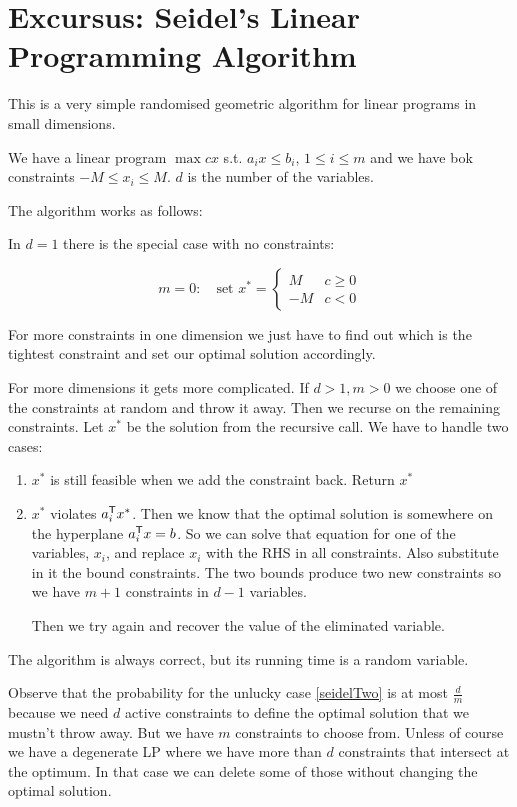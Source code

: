 \section{Excursus: Seidel's Linear Programming Algorithm}

This is a very simple randomised geometric algorithm for linear programs in small dimensions.

We have a linear program $\max cx$ s.t. $a_ix\leq b_i$, $1\leq i\leq m$ and we have bok constraints $-M\leq x_i \leq M$. $d$ is the number of the variables.

The algorithm works as follows:

In $d=1$ there is the special case with no constraints:

\[m=0: \quad \text{set } x^* = \begin{cases} M & c\geq 0\\ -M & c<0\end{cases}\]

For more constraints in one dimension we just have to find out which is the tightest constraint and set our optimal solution accordingly.

For more dimensions it gets more complicated. If $d>1, m>0$ we choose one of the constraints at random and throw it away. Then we recurse on the remaining constraints. Let $x^*$ be the solution from the recursive call. We have to handle two cases:

\begin{enumerate}
\item $x^*$ is still feasible when we add the constraint back. Return $x^*$
\item \label{seidelTwo} $x^*$ violates ${a}^\text{\upshape \sffamily T}_i x^*$. Then we know that the optimal solution is somewhere on the hyperplane ${a}^\text{\upshape \sffamily T}_i x = b$. So we can solve that equation for one of the variables, $x_i$, and replace $x_i$ with the RHS in all constraints. Also substitute in it the bound constraints. The two bounds produce two new constraints so we have $m+1$ constraints in $d-1$ variables.

Then we try again and recover the value of the eliminated variable.
\end{enumerate}

The algorithm is always correct, but its running time is a random variable.

Observe that the probability for the unlucky case \ref{seidelTwo} is at most $\frac dm$ because we need $d$ active constraints to define the optimal solution that we mustn't throw away. But we have $m$ constraints to choose from. Unless of course we have a degenerate LP where we have more than $d$ constraints that intersect at the optimum. In that case we can delete some of those without changing the optimal solution.


